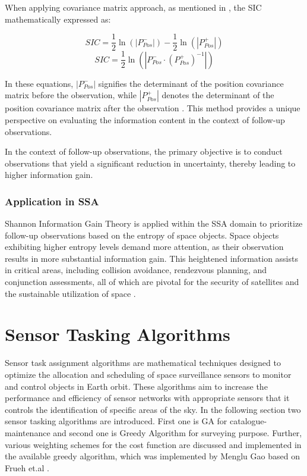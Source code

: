 When applying covariance matrix approach, as mentioned in \cite{hinze1}, the SIC mathematically expressed as:

\begin{equation}
  SIC=\frac{1}{2}\ln(|P^-_{Pos}|)-\frac{1}{2}\ln(|P^+_{Pos}|)
\end{equation}
\begin{equation}
  SIC=\frac{1}{2}\ln(|P^-_{Pos}\cdot(P^+_{Pos})^{-1}|)
\end{equation}

In these equations, $|P^-_{Pos}|$ signifies the determinant of the position covariance matrix before the observation, 
while $|P^+_{Pos}|$ denotes the determinant of the position covariance matrix after the observation \cite{hinze1}. This method provides 
a unique perspective on evaluating the information content in the context of follow-up observations.

In the context of follow-up observations, the primary objective is to conduct observations that yield a significant reduction in uncertainty, thereby leading to higher information gain.

\subsubsection{Application in SSA}
Shannon Information Gain Theory is applied within the SSA domain to prioritize follow-up observations based on the entropy of space objects. Space objects exhibiting higher entropy levels 
demand more attention, as their observation results in more substantial information gain. This heightened information assists in critical areas, including collision avoidance, rendezvous planning, 
and conjunction assessments, all of which are pivotal for the security of satellites and the sustainable utilization of space \cite{hinze1}.

\section{Sensor Tasking Algorithms}
Sensor task assignment algorithms are mathematical techniques designed to optimize the allocation and scheduling of space surveillance sensors to monitor and control objects in Earth orbit. These algorithms aim to increase the performance and efficiency of sensor networks with appropriate sensors that it controls the identification of specific areas of the sky. In the following section two sensor tasking algorithms are introduced. First one is GA for catalogue-maintenance and second one is Greedy Algorithm for surveying purpose.
Further, various weighting schemes for the cost function are discussed and implemented in the available greedy algorithm, which was implemented by Menglu Gao \cite{gao} based on Frueh et.al \cite{fruh1}.

